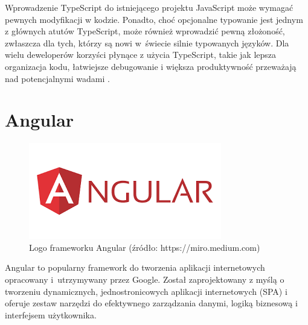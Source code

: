 Wprowadzenie TypeScript do istniejącego projektu JavaScript może wymagać pewnych modyfikacji w kodzie. Ponadto, choć opcjonalne typowanie jest jednym z głównych atutów TypeScript, może również wprowadzić pewną złożoność, zwłaszcza dla tych, którzy są nowi w~świecie silnie typowanych języków. Dla wielu deweloperów korzyści płynące z użycia TypeScript, takie jak lepsza organizacja kodu, łatwiejsze debugowanie i większa produktywność przeważają nad potencjalnymi wadami \cite{typescriptSpecs}.

\section{Angular}
\begin{figure}[h]
    \centering
    \includegraphics[width=0.6\linewidth]{./img/angular.png}
    \caption{Logo frameworku Angular (źródło: https://miro.medium.com)}
    \label{fig:Angular}
\end{figure}
Angular to popularny framework do tworzenia aplikacji internetowych opracowany i~utrzymywany przez Google. Został zaprojektowany z myślą o tworzeniu dynamicznych, jednostronicowych aplikacji internetowych (SPA) i oferuje zestaw narzędzi do efektywnego zarządzania danymi, logiką biznesową i interfejsem użytkownika.

